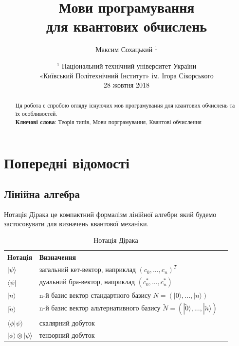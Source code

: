 \documentclass{article}
\theoremstyle{definition}
\begin{document}
\title{Мови програмування \\ для квантових обчислень}
\author{Максим Сохацький $^1$}
\date{ \small $^1$ Національний технічний університет України \\
       «Київський Політехнічний Інститут» ім. Ігора Сікорського \\
       28 жовтня 2018 }
\maketitle

\begin{abstract}
Ця робота є спробою огляду існуючих мов програмування
для квантових обчислень та їх особливостей.
\\
{\bf Ключові слова}: Теорія типів, Мови порграмування, Квантові обчислення
\end{abstract}
\tableofcontents

\newpage

\section{Попередні відомості}

\subsection{Лінійна алгебра}

Нотація Дірака це компактний формалізм лінійної алгебри який будемо застосовувати
для визначень квантової механіки.

\begin{table}[h]
\centering
  \caption{Нотація Дірака}
 \begin{tabular}{lll}
    \hline
       Нотація & Визначення \\
    \hline
       $|\psi\rangle$ & загальний кет-вектор, наприклад $(c_0,...,c_n)^T$ \\
       $\langle\psi|$ & дуальний бра-вектор, наприклад $(c_0^*,...,c_n^*)$ \\
       $|n\rangle$    & n-й базис вектор стандартного базису $N=(|0\rangle,...,|n\rangle)$\\
       $|\tilde{n}\rangle$    & n-й базис вектор альтернативного базису $\tilde{N}=(|\tilde{0}\rangle,...,|\tilde{n}\rangle)$ \\
       $\langle\phi|\psi\rangle$ & скалярний добуток \\
       $|\phi\rangle\otimes|\psi\rangle$ & тензорний добуток \\
    \hline
  \end{tabular}
\end{table}
\end{document}
